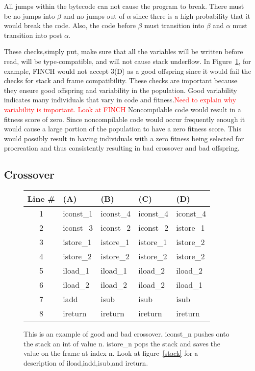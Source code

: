 \documentclass{sig-alternate}
\newcommand{\mycomment}[1]{\textcolor{red}{#1}}
\begin{document}
All jumps within the bytecode can not cause the program to break. There must be no jumps into $\beta$ and no jumps out of $\alpha$ since there is a high probability that it would break the code. Also, the code before $\beta$ must transition into $\beta$ and $\alpha$ must transition into post $\alpha$.\par


These checks,simply put, make sure that all the variables will be written before read, will be type-compatible, and will not cause stack underflow\cite{FINCH2:2009}. In Figure~\ref{crossover}, for example, FINCH would not accept 3(D) as a good offspring since it would fail the checks for stack and frame compatibility.
These checks are important because they ensure good offspring and variability in the population. Good variability indicates many individuals that vary in code and fitness.\mycomment{Need to explain why variability is important. Look at FINCH} Noncompilable code would result in a fitness score of zero. Since noncompilable code would occur frequently enough it would cause a large portion of the population to have a zero fitness score. This would possibly result in having individuals with a zero fitness being selected for procreation and thus consistently resulting in bad crossover and bad offspring.



\subsection{Crossover}

\begin{figure}
\begin{tabular}{|c|l|l|l|l|}

\hline
Line \#&(A)&(B)&(C)&(D)\\  \hline
1&iconst\_1&iconst\_4&iconst\_4&iconst\_4\\
2&iconst\_3&iconst\_2&iconst\_2&istore\_1\\
3&istore\_1&istore\_1&istore\_1&istore\_2\\
4&istore\_2&istore\_2&istore\_2&istore\_2\\
5&iload\_1&iload\_1&iload\_2&iload\_2\\
6&iload\_2&iload\_2&iload\_2&iload\_1\\
7&iadd&isub&isub&isub\\
8&ireturn&ireturn&ireturn&ireturn\\
\hline
\end{tabular}
\caption{This is an example of good and bad crossover. iconst\_n pushes onto the stack an int of value n. istore\_n pops the stack and saves the value on the frame at index n. Look at figure~\ref{stack} for a description of iload,iadd,isub,and ireturn.}
\label{crossover}
  
\end{figure}
\end{document}
